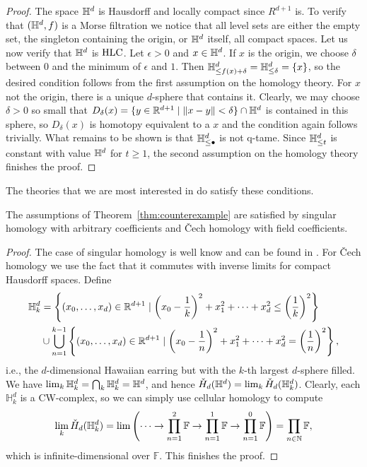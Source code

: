 \begin{proof}
	The space $\mathbb{H}^d$ is Hausdorff and locally compact since $R^{d+1}$ is.
	To verify that $(\mathbb{H}^d,f)$ is a Morse filtration we notice that all level sets are either the empty set, the singleton containing the origin, or $\mathbb{H}^d$ itself, all compact spaces.
	Let us now verify that $\mathbb{H}^d$ is $\mathrm{HLC}$.
	Let $\epsilon > 0$ and $x \in \mathbb{H}^d$.
	If $x$ is the origin, we choose $\delta$ between $0$ and the minimum of $\epsilon$ and $1$.
	Then $\mathbb{H}^d_{\leq f(x) + \delta} = \mathbb{H}^d_{\leq \delta} = \{x\}$, so the desired condition follows from the first assumption on the homology theory.
	For $x$ not the origin, there is a unique $d$-sphere that contains it.
	Clearly, we may choose $\delta > 0$ so small that $D_\delta(x) = \{y \in \mathbb{R}^{d+1} \mid \Vert x - y \Vert < \delta\} \cap \mathbb{H}^d$ is contained in this sphere, so $D_\delta(x)$ is homotopy equivalent to a $x$ and the condition again follows trivially.
	What remains to be shown is that $\mathbb{H}^d_{\leq \bullet}$ is not q-tame.
	Since $\mathbb{H}^d_{\leq t}$ is constant with value $\mathbb{H}^d$ for $t \geq 1$, the second assumption on the homology theory finishes the proof.
\end{proof}

The theories that we are most interested in do satisfy these conditions.

\begin{prop}
	The assumptions of Theorem~\ref{thm:counterexample} are satisfied by singular homology with arbitrary coefficients and \v{Cech} homology with field coefficients.
\end{prop}

\begin{proof}
	The case of singular homology is well know and can be found in \cite{Barratt.1962}.
	For \v{C}ech homology we use the fact that it commutes with inverse limits for compact Hausdorff spaces.
	Define 
	\begin{align*}
	\mathbb{H}^d_k &= \left\{(x_0,\dots,x_d)\in\mathbb{R}^{d+1}\mid \left(x_0-\frac{1}{k}\right)^2+x_1^2+\dots+x_d^2 \leq \left(\frac{1}{k}\right)^2\right\}\\
	&\cup\bigcup_{n=1}^{k-1}\left\{(x_0,\dots,x_d)\in\mathbb{R}^{d+1}\mid \left(x_0-\frac{1}{n}\right)^2+x_1^2+\dots+x_d^2=\left(\frac{1}{n}\right)^2\right\},
	\end{align*}
	i.e., the $d$-dimensional Hawaiian earring but with the $k$-th largest $d$-sphere filled.
	We have $\lim_{k}\mathbb{H}^d_{k} = \bigcap_{k}\mathbb{H}^{d}_{k}=\mathbb{H}^{d}$, and hence $\check{H}_{d}(\mathbb{H}^d) = \lim_{k}\check{H}_{d}(\mathbb{H}^{d}_{k})$.
	Clearly, each $\mathbb{H}^{d}_{k}$ is a CW-complex, so we can simply use cellular homology to compute
	\begin{equation*}
	\lim_{k}\check{H}_{d}(\mathbb{H}^{d}_{k})=\lim\left(\dots\to \prod_{n=1}^2\mathbb{F}\to \prod_{n=1}^1\mathbb{F}\to \prod_{n=1}^0\mathbb{F}\right)=\prod_{n\in\mathbb{N}}\mathbb{F},
	\end{equation*}
	which is infinite-dimensional over $\mathbb{F}$.
	This finishes the proof.
\end{proof}

